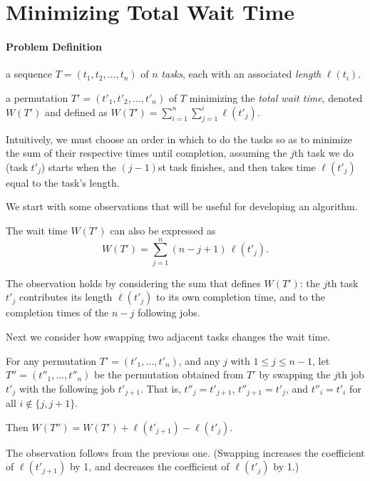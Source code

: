 \section{Minimizing Total Wait Time}\label{sec: min wait time}

\paragraph{Problem Definition}
\begin{mylist}
\item[\bf input:] a sequence $T=(t_1, t_2, \ldots, t_n)$ of $n$ \emph{tasks},
  each with an associated \emph{length} $\ell(t_i)$.
\item[\bf output:] a permutation $T'=(t'_1, t'_2, \ldots, t'_n)$ of $T$ minimizing the \emph{total wait time},
  denoted  $W(T')$ and defined as $W(T') = \sum_{i=1}^n \sum_{j=1}^i \ell(t'_j)$.
\end{mylist}
Intuitively, we must choose an order in which to do the tasks
so as to minimize the sum of their respective times until completion,
assuming the $j$th task we do (task $t'_j$)
starts when the $(j-1)$st task finishes,
and then takes time $\ell(t'_j)$ equal to the task's length.

We start with some observations that will be useful for developing an algorithm.
\begin{observation}\label{obs: wait time 1} 
  The wait time $W(T')$ can also be expressed as
  \[
    W(T') = \sum_{j=1}^n (n-j+1)\, \ell(t'_j).
  \]
\end{observation}
The observation holds by considering the sum that defines $W(T')$:
the $j$th task $t'_j$ contributes its length $\ell(t'_j)$
to its own completion time, and to the completion times of the $n-j$ following jobs.

Next we consider how swapping two adjacent tasks changes the wait time.
\begin{observation}\label{obs: wait time 2} 
  For any permutation $T'=(t'_1, \ldots, t'_n)$,
  and any $j$ with $1\le j \le n-1$,
  let $T''=(t''_1, \ldots, t''_n)$ be the permutation obtained from $T'$ by swapping
  the $j$th job $t'_j$ with the following job $t'_{j+1}$.
  That is, $t''_j = t'_{j+1}$, $t''_{j+1} = t'_j$,
  and $t''_i = t'_i$ for all $i\not\in \{j, j+1\}$.

  Then $W(T'') = W(T') + \ell(t'_{j+1}) - \ell(t'_j)$.
\end{observation}
The observation follows from the previous one.
(Swapping increases the coefficient of $\ell(t'_{j+1})$ by 1,
and decreases the coefficient of  $\ell(t'_{j})$ by 1.)

